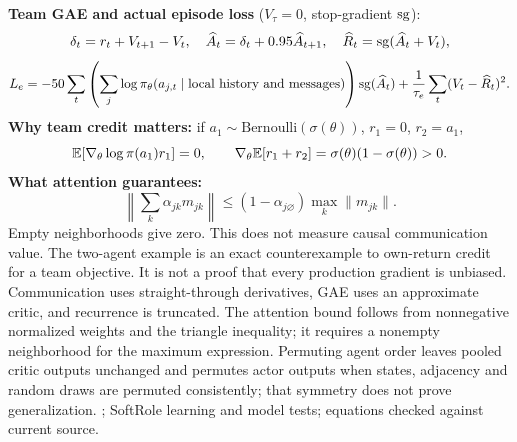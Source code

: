 {\small
\textbf{Team GAE and actual episode loss} ($V_\tau=0$, stop-gradient $\operatorname{sg}$):
\[
\delta_t=r_t+V_{t+1}-V_t,\quad \widehat A_t=\delta_t+0.95\widehat A_{t+1},\quad
\widehat R_t=\operatorname{sg}(\widehat A_t+V_t),
\]
\[
L_e=-50\sum_t\left(\sum_j\log\pi_\theta(a_{j,t}\mid\text{local history and messages})\right)\operatorname{sg}(\widehat A_t)
+\frac1{\tau_e}\sum_t(V_t-\widehat R_t)^2.
\]
\textbf{Why team credit matters:} if $a_1\sim\mathrm{Bernoulli}(\sigma(\theta))$, $r_1=0$, $r_2=a_1$,
\[
\mathbb{E}[\nabla_\theta\log\pi(a_1)r_1]=0,\qquad
\nabla_\theta\mathbb{E}[r_1+r_2]=\sigma(\theta)(1-\sigma(\theta))>0.
\]
\textbf{What attention guarantees:}
\[
\left\|\sum_k\alpha_{jk}m_{jk}\right\|\le(1-\alpha_{j\varnothing})\max_k\|m_{jk}\|.
\]
Empty neighborhoods give zero. This does not measure causal communication value.}
{The two-agent example is an exact counterexample to own-return credit for a team objective. It is not a proof that every production gradient is unbiased. Communication uses straight-through derivatives, GAE uses an approximate critic, and recurrence is truncated. The attention bound follows from nonnegative normalized weights and the triangle inequality; it requires a nonempty neighborhood for the maximum expression. Permuting agent order leaves pooled critic outputs unchanged and permutes actor outputs when states, adjacency and random draws are permuted consistently; that symmetry does not prove generalization.}
{; SoftRole learning and model tests; equations checked against current source.}

